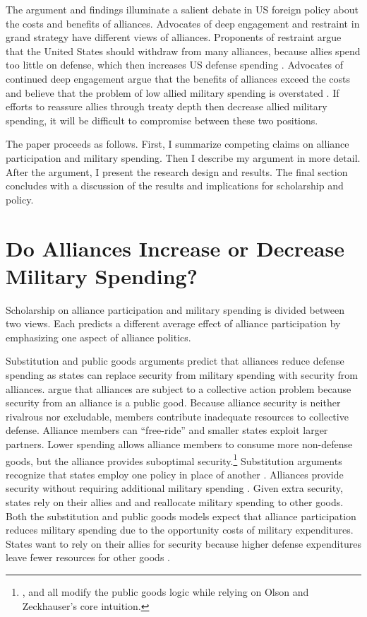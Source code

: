 \documentclass[12pt]{article}
\begin{document}
The argument and findings illuminate a salient debate in US foreign policy about the costs and benefits of alliances. 
Advocates of deep engagement \citep{Brooksetal2013} and restraint \citep{Posen2014} in grand strategy have different views of alliances. 
Proponents of restraint argue that the United States should withdraw from many alliances, because allies spend too little on defense, which then increases US defense spending \citep{Preble2009}.
Advocates of continued deep engagement argue that the benefits of alliances exceed the costs and believe that the problem of low allied military spending is overstated \citep{BrandsFeaver2017}. 
If efforts to reassure allies through treaty depth then decrease allied military spending, it will be difficult to compromise between these two positions.  


The paper proceeds as follows. 
First, I summarize competing claims on alliance participation and military spending. 
Then I describe my argument in more detail. 
After the argument, I present the research design and results. 
The final section concludes with a discussion of the results and implications for scholarship and policy.  



\section{Do Alliances Increase or Decrease Military Spending?}


Scholarship on alliance participation and military spending is divided between two views.
Each predicts a different average effect of alliance participation by emphasizing one aspect of alliance politics.   


Substitution and public goods arguments predict that alliances reduce defense spending as states can replace security from military spending with security from alliances.
\citet{OlsonZeckhauser1966} argue that alliances are subject to a collective action problem because security from an alliance is a public good.
Because alliance security is neither rivalrous nor excludable, members contribute inadequate resources to collective defense. 
Alliance members can ``free-ride'' and smaller states exploit larger partners. 
Lower spending allows alliance members to consume more non-defense goods, but the alliance provides suboptimal security.\footnote{\citet{SandlerForbes1980}, \citet{Oneal1990} and \citet{SandlerHartley2001} all modify the public goods logic while relying on Olson and Zeckhauser's core intuition.} 
Substitution arguments recognize that states employ one policy in place of another \citep{MostStarr1989}.
Alliances provide security without requiring additional military spending \citep{Morrow1993, Conybeare1994}. 
Given extra security, states rely on their allies and and reallocate military spending to other goods. 
Both the substitution and public goods models expect that alliance participation reduces military spending due to the opportunity costs of military expenditures. 
States want to rely on their allies for security because higher defense expenditures leave fewer resources for other goods \citep{Fordham1998, Fearon2018}.
\end{document}
